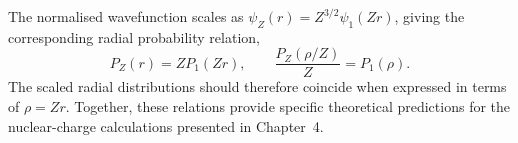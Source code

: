 The normalised wavefunction scales
as $\psi_Z(r)=Z^{3/2}\psi_1(Zr)$,
giving the corresponding radial
probability relation,
\begin{equation}
    P_Z(r)=ZP_1(Zr),
    \qquad
    \frac{P_Z(\rho/Z)}{Z}=P_1(\rho).
    \label{eq:radial_scaling}
\end{equation}
The scaled radial distributions
should therefore coincide when
expressed in terms of $\rho=Zr$.
Together, these relations provide
specific theoretical predictions
for the nuclear-charge calculations
presented in Chapter~4.
